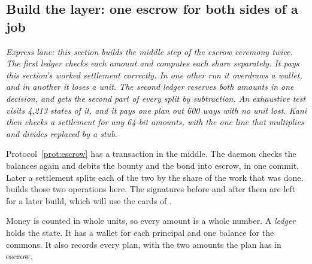 %
%
\subsection{Build the layer: one escrow for both sides of a job}
\label{sec:he-plan}

\noindent\emph{Express lane: this section builds the middle step of the
escrow ceremony twice. The first ledger checks each amount and computes
each share separately. It pays this section's worked settlement correctly.
In one other run it overdraws a wallet, and in another it loses a unit.
The second ledger reserves both amounts in one decision, and gets the
second part of every split by subtraction. An exhaustive test visits 4,213
states of it, and it pays one plan out 600 ways with no unit lost. Kani
then checks a settlement for any 64-bit amounts, with the one line that
multiplies and divides replaced by a stub.}

Protocol~\ref{prot:escrow} has a transaction in the middle. The daemon
checks the balances again and debits the bounty and the bond into escrow,
in one commit. Later a settlement splits each of the two by the share of
the work that was done. \pdkernelname{} builds those two operations here.
The signatures before and after them are left for a later build, which
will use the cards of .

Money is counted in whole units, so every amount is a whole number. A
\emph{ledger} holds the state. It has a wallet for each principal and one
balance for the commons. It also records every plan, with the two amounts
the plan has in escrow.

